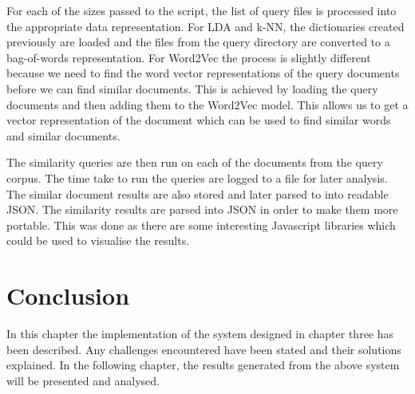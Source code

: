 For each of the sizes passed to the script, the list of query files is processed into the appropriate data representation.
For LDA and k-NN, the dictionaries created previously are loaded and the files from the query directory are converted to a bag-of-words representation.
For Word2Vec the process is slightly different because we need to find the word vector representations of the query documents before we can find similar documents.
This is achieved by loading the query documents and then adding them to the Word2Vec model.
This allows us to get a vector representation of the document which can be used to find similar words and similar documents.

The similarity queries are then run on each of the documents from the query corpus.
The time take to run the queries are logged to a file for later analysis.
The similar document results are also stored and later parsed to into readable JSON.
The similarity results are parsed into JSON in order to make them more portable.
This was done as there are some interesting Javascript libraries which could be used to visualise the results.

\section{Conclusion}
In this chapter the implementation of the system designed in chapter three has been described.
Any challenges encountered have been stated and their solutions explained.
In the following chapter, the results generated from the above system will be presented and analysed.
